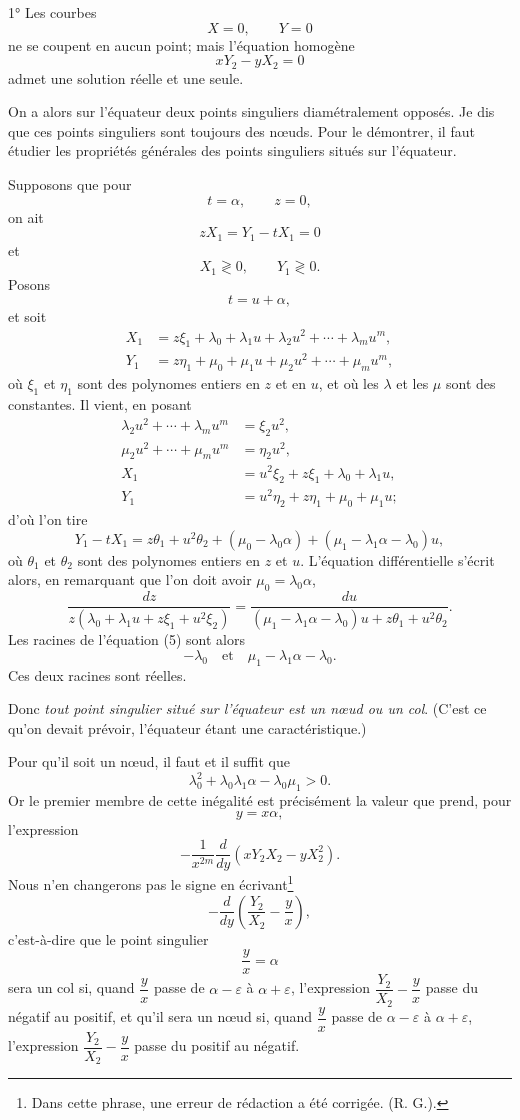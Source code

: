 \documentclass[11pt]{article}
\begin{document}
1° Les courbes
\[
X=0,\qquad Y=0
\]
ne se coupent en aucun point; mais l’équation homogène
\[
xY_2-yX_2=0
\]
admet une solution réelle et une seule.

On a alors sur l’équateur deux points singuliers diamétralement opposés. Je dis que ces points singuliers sont toujours des nœuds. Pour le démontrer, il faut étudier les propriétés générales des points singuliers situés sur l’équateur.

Supposons que pour
\[
t=\alpha,\qquad z=0,
\]
on ait
\[
zX_1=Y_1-tX_1=0
\]
et
\[
X_1\gtrless0,\qquad Y_1\gtrless0.
\]
Posons
\[
t=u+\alpha,
\]
et soit
\[
\begin{aligned}
X_1&=z\xi_1+\lambda_0+\lambda_1u+\lambda_2u^2+\cdots+\lambda_mu^m,\\
Y_1&=z\eta_1+\mu_0+\mu_1u+\mu_2u^2+\cdots+\mu_mu^m,
\end{aligned}
\]
où $\xi_1$ et $\eta_1$ sont des polynomes entiers en $z$ et en $u$, et où les $\lambda$ et les $\mu$ sont des constantes. Il vient, en posant
\[
\begin{aligned}
\lambda_2u^2+\cdots+\lambda_mu^m&=\xi_2u^2,\\
\mu_2u^2+\cdots+\mu_mu^m&=\eta_2u^2,\\
X_1&=u^2\xi_2+z\xi_1+\lambda_0+\lambda_1u,\\
Y_1&=u^2\eta_2+z\eta_1+\mu_0+\mu_1u;
\end{aligned}
\]
d’où l’on tire
\[
Y_1-tX_1=z\theta_1+u^2\theta_2+(\mu_0-\lambda_0\alpha)+(\mu_1-\lambda_1\alpha-\lambda_0)u,
\]
où $\theta_1$ et $\theta_2$ sont des polynomes entiers en $z$ et $u$. L’équation différentielle s’écrit alors, en remarquant que l’on doit avoir $\mu_0=\lambda_0\alpha$,
\[
\frac{dz}{z(\lambda_0+\lambda_1u+z\xi_1+u^2\xi_2)}=
\frac{du}{(\mu_1-\lambda_1\alpha-\lambda_0)u+z\theta_1+u^2\theta_2}.\tag{1}
\]
Les racines de l’équation (5) sont alors
\[
-\lambda_0\quad\text{et}\quad \mu_1-\lambda_1\alpha-\lambda_0.
\]
Ces deux racines sont réelles.

Donc \emph{tout point singulier situé sur l’équateur est un nœud ou un col}. (C’est ce qu’on devait prévoir, l’équateur étant une caractéristique.)

Pour qu’il soit un nœud, il faut et il suffit que
\[
\lambda_0^2+\lambda_0\lambda_1\alpha-\lambda_0\mu_1>0.
\]
Or le premier membre de cette inégalité est précisément la valeur que prend, pour
\[
y=x\alpha,
\]
l’expression
\[
-\frac1{x^{2m}}\frac{d}{dy}(xY_2X_2-yX_2^2).
\]
Nous n’en changerons pas le signe en écrivant\footnote{Dans cette phrase, une erreur de rédaction a été corrigée. (R. G.).}
\[
-\frac{d}{dy}\left(\frac{Y_2}{X_2}-\frac yx\right),
\]
c’est-à-dire que le point singulier
\[
\frac yx=\alpha
\]
sera un col si, quand $\dfrac yx$ passe de $\alpha-\varepsilon$ à $\alpha+\varepsilon$, l’expression $\dfrac{Y_2}{X_2}-\dfrac yx$ passe du négatif au positif, et qu’il sera un nœud si, quand $\dfrac yx$ passe de $\alpha-\varepsilon$ à $\alpha+\varepsilon$, l’expression $\dfrac{Y_2}{X_2}-\dfrac yx$ passe du positif au négatif.
\end{document}
